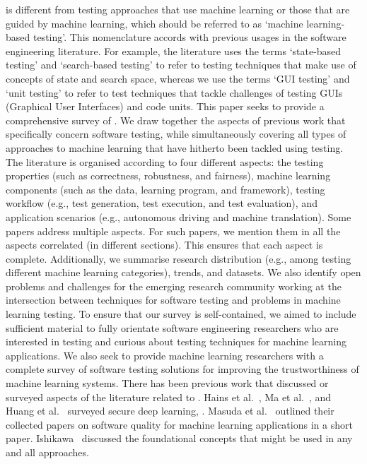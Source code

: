 \mlt{} is different from testing approaches that use machine learning or those that are guided by machine learning, which should be referred to as `machine learning-based testing'.
This nomenclature accords with previous usages in the software engineering literature. 
For example, the literature uses the terms `state-based testing'  
and `search-based testing'  
to refer to testing techniques that make use of concepts of state and search space, 
whereas we use the terms `GUI testing' 
and `unit testing'  
to refer to test techniques that tackle challenges of testing GUIs (Graphical User Interfaces) and code units. 
This paper seeks to provide a comprehensive survey of \mlt{}.
We draw together the aspects of previous work that specifically concern software testing, while simultaneously covering all types of approaches to machine learning that have hitherto been tackled using testing.
The literature is organised according to four different aspects: the testing properties (such as correctness, robustness, and fairness), machine learning components (such as the data, learning program, and framework), testing workflow (e.g., test generation, test execution, and test evaluation), and application scenarios (e.g., autonomous driving and machine translation).
Some papers address multiple aspects.
For such papers, we mention them in all the aspects correlated (in different sections).
This ensures that each aspect is complete. 
Additionally, we summarise research distribution (e.g., among testing different machine learning categories), trends, and datasets.
We also identify open problems and challenges for the emerging research community working at the intersection between techniques for software testing and problems in machine learning testing. 
To ensure that our survey is self-contained, we aimed to include sufficient material to fully orientate software engineering researchers who are interested in testing and curious about testing techniques for machine learning applications.
We also seek to provide machine learning researchers with a complete survey of software testing solutions for improving the trustworthiness of machine learning systems.
There has been previous work that discussed or surveyed aspects of the literature related to \mlt{}.
Hains et al.~, Ma et al.~, and Huang et al.~
surveyed secure deep learning, .
Masuda et al.~ outlined their collected papers on software quality for machine learning applications in a short paper. 
Ishikawa~ discussed the foundational concepts that might be used in any and all \mlt{} approaches.
